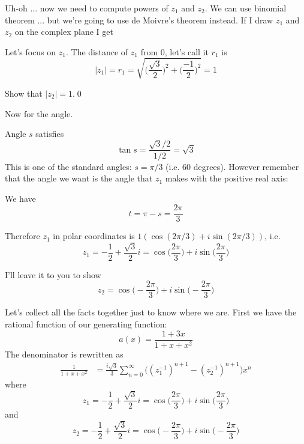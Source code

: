 Uh-oh ... now we need to compute powers of $z_1$ and $z_2$.
We can use binomial theorem ... but we're going to use de Moivre's theorem instead.
If I draw $z_1$ and $z_2$ on the complex plane I get

Let's focus on $z_1$.
The distance of $z_1$ from $0$, let's call it $r_1$ is
\[
|z_1| = r_1 = \sqrt{ \biggl( \frac{\sqrt{3}}{2} \biggr)^2 + \biggl( \frac{-1}{2} \biggr)^2 } = 1
\]

\begin{ex}
Show that $|z_2| = 1$.\qed
\end{ex}

Now for the angle.

Angle $s$ satisfies
\[
\tan s = \frac{\sqrt{3}/2}{1/2} = \sqrt{3}
\]
This is one of the standard angles: $s = \pi/3$ (i.e. 60 degrees).
However remember that the angle we want is the angle that $z_1$ makes with 
the positive real axis:

We have
\[
t = \pi - s = \frac{2\pi}{3}
\]

Therefore $z_1$ in polar coordinates is $1 (\cos (2\pi/3) + i \sin(2\pi/3))$, i.e.
\[
z_1 = -\frac{1}{2} + \frac{\sqrt{3}}{2}i = \cos \biggl( \frac{2\pi}{3} \biggr) + i \sin \biggl( \frac{2\pi}{3} \biggl)
\]

I'll leave it to you to show
\[
z_2 = \cos \biggl( -\frac{2\pi}{3} \biggr) + i \sin \biggl( -\frac{2\pi}{3} \biggl)
\]

Let's collect all the facts together just to know where we are.
First we have the rational function of our generating function:
\[
a(x) = \frac{1 + 3x}{1 + x + x^2}
\]
The denominator is rewritten as
\begin{align*}
\frac{1}{1 + x + x^2}
&=
\frac{i\sqrt{3}}{3}
\sum_{n=0}^\infty 
\biggl( 
(z_1^{-1})^{n+1}  
-  (z_2^{-1})^{n+1} 
\biggr) 
x^n
\end{align*}
where
\[
z_1 = -\frac{1}{2} + \frac{\sqrt{3}}{2}i = \cos \biggl( \frac{2\pi}{3} \biggr) + i \sin \biggl( \frac{2\pi}{3} \biggl)
\]
and
\[
z_2 = -\frac{1}{2} + \frac{\sqrt{3}}{2}i = \cos \biggl( -\frac{2\pi}{3} \biggr) + i \sin \biggl( -\frac{2\pi}{3} \biggl)
\]

